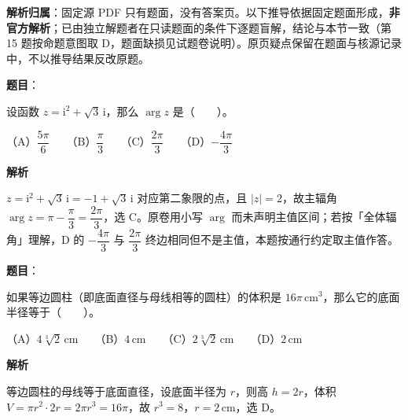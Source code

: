 

\begin{gknotice}
\textbf{解析归属}：固定源 PDF 只有题面，没有答案页。以下推导依据固定题面形成，\textbf{非官方解析}；已由独立解题者在只读题面的条件下逐题盲解，结论与本节一致（第 15 题按命题意图取 D，题面缺损见试题卷说明）。原页疑点保留在题面与核源记录中，不以推导结果反改原题。
\end{gknotice}

\begin{answer}

\textbf{题目}：

设函数 $z=\mathrm{i}^2+\sqrt3\,\mathrm{i}$，那么 $\arg z$ 是\mbox{（　　）}。

（A）$\dfrac{5\pi}{6}$　　（B）$\dfrac{\pi}{3}$　　（C）$\dfrac{2\pi}{3}$　　（D）$-\dfrac{4\pi}{3}$

\textbf{解析}

$z=\mathrm{i}^2+\sqrt3\,\mathrm{i}=-1+\sqrt3\,\mathrm{i}$ 对应第二象限的点，且 $|z|=2$，故主辐角 $\arg z=\pi-\dfrac{\pi}{3}=\dfrac{2\pi}{3}$，选 C。原卷用小写 $\arg$ 而未声明主值区间；若按「全体辐角」理解，D 的 $-\dfrac{4\pi}{3}$ 与 $\dfrac{2\pi}{3}$ 终边相同但不是主值，本题按通行约定取主值作答。


\end{answer}
\begin{answer}

\textbf{题目}：

如果等边圆柱（即底面直径与母线相等的圆柱）的体积是 $16\pi\,\mathrm{cm}^3$，那么它的底面半径等于\mbox{（　　）}。

（A）$4\sqrt[3]{2}\,\mathrm{cm}$　　（B）$4\,\mathrm{cm}$　　（C）$2\sqrt[3]{2}\,\mathrm{cm}$　　（D）$2\,\mathrm{cm}$

\textbf{解析}

等边圆柱的母线等于底面直径，设底面半径为 $r$，则高 $h=2r$，体积 $V=\pi r^2\cdot2r=2\pi r^3=16\pi$，故 $r^3=8$，$r=2\,\mathrm{cm}$，选 D。


\end{answer}
